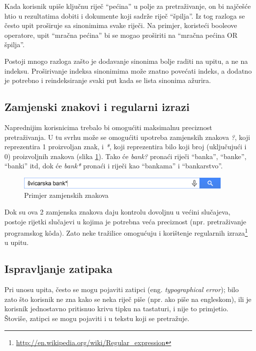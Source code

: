 \documentclass[a4paper,twoside,12pt]{scrreprt}
\begin{document}

Kada korisnik upiše ključnu riječ ``pećina'' u polje za pretraživanje, on bi najčešće htio u rezultatima dobiti i dokumente koji sadrže riječ ``špilja''. Iz tog razloga se često upit proširuje sa sinonimima svake riječi. Na primjer, koristeći booleove operatore, upit ``mračna pećina'' bi se mogao proširiti na ``mračna pećina OR špilja''.

Postoji mnogo razloga zašto je dodavanje sinonima bolje raditi na upitu, a ne na indeksu. Proširivanje indeksa sinonimima može znatno povećati indeks, a dodatno je potrebno i reindeksiranje svaki put kada se lista sinonima ažurira.

\subsection{Zamjenski znakovi i regularni izrazi}

Naprednijim korisnicima trebalo bi omogućiti maksimalnu preciznost pretraživanja. U tu svrhu može se omogućiti upotreba zamjenskih znakova \textit{?}, koji reprezentira 1 proizvoljan znak, i \textit{*}, koji reprezentira bilo koji broj (uključujući i 0) proizvoljnih znakova (slika \ref{wildcards}). Tako će \textit{bank?} pronaći riječi ``banka'', ``banke'', ``banki'' itd, dok će \textit{bank*} pronaći i riječi kao ``bankama'' i ``bankarstvo''.

\begin{figure}[H]
  \centering
  \includegraphics[width=300pt]{wildcards}
  \caption{Primjer zamjenskih znakova}
  \label{wildcards}
\end{figure}

Dok su ova 2 zamjenska znakova daju kontrolu dovoljnu u većini slučajeva, postoje rijetki slučajevi u kojima je potrebna veća preciznost (npr. pretraživanje programskog kôda). Zato neke tražilice omogućuju i korištenje regularnih izraza\footnote{\url{http://en.wikipedia.org/wiki/Regular_expression}} u upitu.

\subsection{Ispravljanje zatipaka}

Pri unosu upita, često se mogu pojaviti zatipci (eng. \textit{typographical error}); bilo zato što korisnik ne zna kako se neka riječ piše (npr. ako piše na engleskom), ili je korisnik jednostavno pritisnuo krivu tipku na tastaturi, i nije to primjetio. Štoviše, zatipci se mogu pojaviti i u tekstu koji se pretražuje.
\end{document}
